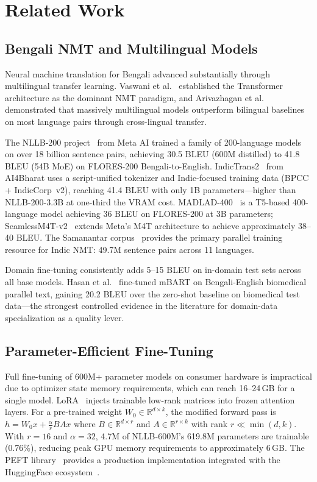 \documentclass[sigconf]{acmart}
\begin{document}
\section{Related Work}

\subsection{Bengali NMT and Multilingual Models}

Neural machine translation for Bengali advanced substantially through multilingual
transfer learning.
Vaswani et al.~\cite{vaswani2017attention} established the Transformer architecture
as the dominant NMT paradigm, and Arivazhagan et al.~\cite{arivazhagan2019massively}
demonstrated that massively multilingual models outperform bilingual baselines on
most language pairs through cross-lingual transfer.

The NLLB-200 project~\cite{nllb2022} from Meta AI trained a family of
200-language models on over 18 billion sentence pairs, achieving 30.5 BLEU
(600M distilled) to 41.8 BLEU (54B MoE) on FLORES-200 Bengali-to-English.
IndicTrans2~\cite{gala2023indictrans2} from AI4Bharat uses a script-unified
tokenizer and Indic-focused training data (BPCC + IndicCorp~v2), reaching
41.4 BLEU with only 1B parameters---higher than NLLB-200-3.3B at one-third
the VRAM cost.
MADLAD-400~\cite{kudugunta2023madlad} is a T5-based 400-language model achieving
36 BLEU on FLORES-200 at 3B parameters; SeamlessM4T-v2~\cite{seamlessm4t2023}
extends Meta's M4T architecture to achieve approximately 38--40 BLEU.
The Samanantar corpus~\cite{samanantar2022} provides the primary parallel training
resource for Indic NMT: 49.7M sentence pairs across 11 languages.

Domain fine-tuning consistently adds 5--15 BLEU on in-domain test sets across
all base models.
Hasan et al.~\cite{hasan2020low} fine-tuned mBART on Bengali-English biomedical
parallel text, gaining 20.2 BLEU over the zero-shot baseline on biomedical test
data---the strongest controlled evidence in the literature for domain-data
specialization as a quality lever.

\subsection{Parameter-Efficient Fine-Tuning}

Full fine-tuning of 600M+ parameter models on consumer hardware is impractical
due to optimizer state memory requirements, which can reach 16--24\,GB for a
single model.
LoRA~\cite{hu2021lora} injects trainable low-rank matrices into frozen attention
layers.
For a pre-trained weight $W_0 \in \mathbb{R}^{d \times k}$, the modified forward
pass is $h = W_0 x + \frac{\alpha}{r} B A x$ where $B \in \mathbb{R}^{d \times r}$
and $A \in \mathbb{R}^{r \times k}$ with rank $r \ll \min(d,k)$.
With $r=16$ and $\alpha=32$, 4.7M of NLLB-600M's 619.8M parameters are trainable
(0.76\%), reducing peak GPU memory requirements to approximately 6\,GB.
The PEFT library~\cite{peft2022} provides a production implementation integrated
with the HuggingFace ecosystem~\cite{wolf2020transformers}.
\end{document}
